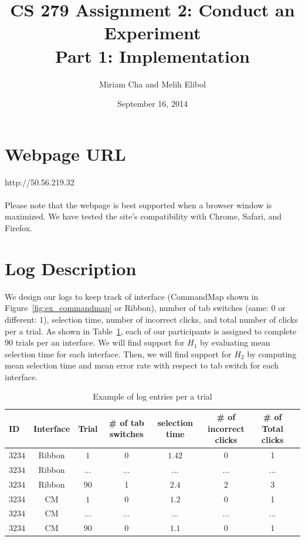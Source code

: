 \documentclass{article}
\title{CS 279 Assignment 2: Conduct an Experiment\\Part 1: Implementation}
\author{Miriam Cha and Melih Elibol}
\date{September 16, 2014}
\begin{document}
\maketitle

\section*{Webpage URL}
http://50.56.219.32
 \\
 \\
 Please note that the webpage is best supported when a browser window is maximized. We have tested the site's compatibility with Chrome, Safari, and Firefox. 
\section*{Log Description} 
 We design our logs to keep track of interface (CommandMap shown in Figure~\ref{fig:ex_commandmap} or Ribbon), number of tab switches (same: 0 or different: 1),  selection time, number of incorrect clicks, and total number of clicks per a trial. As shown in Table~\ref{fig:trial_log}, each of our participants is assigned to complete $90$ trials per an interface. We will find support for $H_1$ by evaluating mean selection time for each interface. Then, we will find support for $H_2$ by computing mean selection time and mean error rate with respect to tab switch for each interface.  
 \begin{table}[tbh]
  \centering
\begin{tabular}{|l|c|c|c|c|c|c|c|}
  \hline
 ID &  Interface  &  Trial &  \# of tab switches & selection time & \# of incorrect clicks & \# of Total clicks              \\\hline
 $3234$ &   Ribbon  & $1$  & 0  & $1.42$ & 0  &1 \\ \hline
$3234$  &    Ribbon &   $...$ & ...  & ... &  ... & ...\\\hline       
$3234$  &    Ribbon &   $90$ & 1  & $2.4$ &2  &3 \\\hline      
$3234$  &    CM &   $1$ & 0  & $1.2$ & 0 & 1 \\\hline   
$3234$  &    CM &   $...$ & ...  & ... &  ... & ...\\\hline   
$3234$  &    CM &   $90$ & 0  & $1.1$ & 0 & 1 \\\hline  
\end{tabular}
\caption{Example of log entries per a trial}
\label{fig:trial_log}
\end{table}
\end{document}
